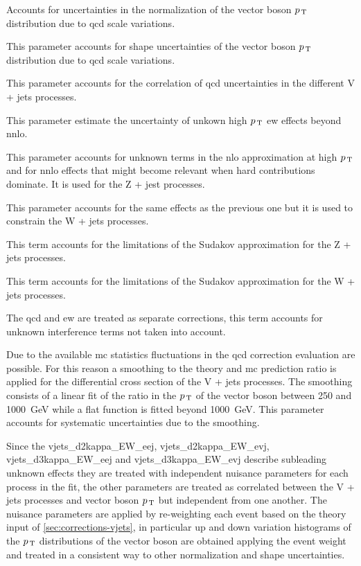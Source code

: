 \begin{description}[font=\normalfont]
\item[vjets\_d1K\_NLO:] Accounts for uncertainties in the normalization of the
  vector boson $p_\mathrm{\, T}$ distribution due to \gls{qcd} scale variations.
\item[vjets\_d2K\_NLO:] This parameter accounts for shape uncertainties of the
  vector boson $p_\mathrm{\, T}$ distribution due to \gls{qcd} scale variations.
\item[vjets\_d3K\_NLO:] This parameter accounts for the correlation of \gls{qcd}
  uncertainties in the different V + jets processes.
\item[vjets\_d1kappa\_EW:] This parameter estimate the uncertainty of unkown
  high $p_\mathrm{\, T}$ \gls{ew} effects beyond \gls{nnlo}.
\item[vjets\_d2kappa\_EW\_eej:] This parameter accounts for unknown terms in the
  \gls{nlo} approximation at high $p_\mathrm{\, T}$ and for \gls{nnlo} effects that might
  become relevant when hard contributions dominate. It is used for the Z + jest
  processes.
\item[vjets\_d2kappa\_EW\_evj:] This parameter accounts for the same effects as
  the previous one but it is used to constrain the W + jets processes.
\item[vjets\_d3kappa\_EW\_eej:] This term accounts for the limitations of the
  Sudakov approximation for the Z + jets processes.
\item[vjets\_d3kappa\_EW\_evj:] This term accounts for the limitations of the
  Sudakov approximation for the W + jets processes.
\item[vjets\_dK\_NLO\_mix:] The \gls{qcd} and \gls{ew} are treated as separate
  corrections, this term accounts for unknown interference terms not taken into
  account.
\item[vjets\_QCDSmoothing:] Due to the available \gls{mc} statistics
  fluctuations in the \gls{qcd} correction evaluation are possible. For this
  reason a smoothing to the theory and \gls{mc} prediction ratio is applied for
  the differential cross section of the V + jets processes. The smoothing
  consists of a linear fit of the ratio in the $p_\mathrm{\, T}$ of the vector boson between
  250 and 1000~GeV while a flat function is fitted beyond 1000~GeV. This
  parameter accounts for systematic uncertainties due to the smoothing.
\end{description}
Since the vjets\_d2kappa\_EW\_eej, vjets\_d2kappa\_EW\_evj,
vjets\_d3kappa\_EW\_eej and vjets\_d3kappa\_EW\_evj describe subleading unknown
effects they are treated with independent nuisance parameters for each process
in the fit, the other parameters are treated as correlated between the V + jets
processes and vector boson $p_\mathrm{\, T}$ but independent from one another. The nuisance
parameters are applied by re-weighting each event based on the theory input of
\cref{sec:corrections-vjets}, in particular up and down variation histograms of
the $p_\mathrm{\, T}$ distributions of the vector boson are obtained applying the event
weight and treated in a consistent way to other normalization and shape
uncertainties.
